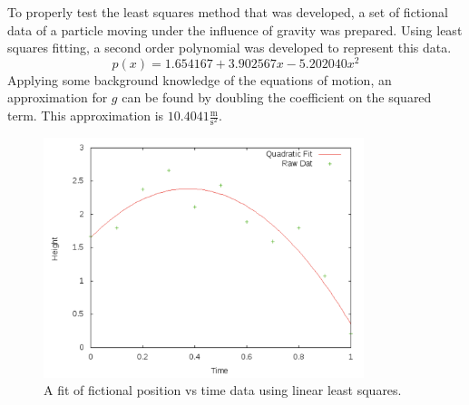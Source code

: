 \documentclass[12pt]{article}
\begin{document}
To properly test the least squares method that was developed, a set of fictional data of a particle moving under the influence of gravity was prepared.  Using least squares fitting, a second order polynomial was developed to represent this data.
\begin{equation}
\label{gravityFit}
p(x) = 1.654167 + 3.902567 x -5.202040x^2
\end{equation}
Applying some background knowledge of the equations of motion, an approximation for $g$ can be found by doubling the coefficient on the squared term.  This approximation is $10.4041 \frac{\text{m}}{\text{s}^2}$.
\begin{figure}[!h]
\centering
\includegraphics[width =120 mm, height = 70mm]{Ex_3_20.pdf}
\caption{A fit of fictional position vs time data using linear least squares.}
\label{fig:3.20}
\end{figure}
\end{document}
